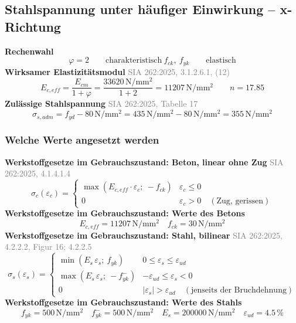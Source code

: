 \documentclass[11pt,a4paper]{article}
\newcommand{\normref}[1]{{\small\textcolor{gray}{#1}}}
\begin{document}
\subsection{Stahlspannung unter häufiger Einwirkung – x-Richtung}
\noindent\textbf{Rechenwahl}
\begin{equation*}
\varphi = 2 \qquad \text{charakteristisch}\ f_{ck},\ f_{yk} \qquad \text{elastisch}
\end{equation*}
\noindent\textbf{Wirksamer Elastizitätsmodul} \hfill \normref{SIA 262:2025, 3.1.2.6.1, (12)}
\begin{equation*}
E_{c,eff} = \frac{E_{cm}}{1 + \varphi} = \frac{33620\,\mathrm{N}/\mathrm{mm}^{2}}{1 + 2} = 11207\,\mathrm{N}/\mathrm{mm}^{2} \qquad n = 17.85
\end{equation*}
\noindent\textbf{Zulässige Stahlspannung} \hfill \normref{SIA 262:2025, Tabelle 17}
\begin{equation*}
\sigma_{s,adm} = f_{yd} - 80\,\mathrm{N}/\mathrm{mm}^{2} = 435\,\mathrm{N}/\mathrm{mm}^{2} - 80\,\mathrm{N}/\mathrm{mm}^{2} = 355\,\mathrm{N}/\mathrm{mm}^{2}
\end{equation*}
\subsubsection{Welche Werte angesetzt werden}
\noindent\textbf{Werkstoffgesetze im Gebrauchszustand: Beton, linear ohne Zug} \hfill \normref{SIA 262:2025, 4.1.4.1.4}
\begin{equation*}
\sigma_c(\varepsilon_c) = \begin{cases} \max\left(E_{c,eff} \cdot \varepsilon_c;\ -f_{ck}\right) & \varepsilon_c \le 0 \\[1ex] 0 & \varepsilon_c > 0 \quad (\text{Zug, gerissen}) \end{cases}
\end{equation*}
\noindent\textbf{Werkstoffgesetze im Gebrauchszustand: Werte des Betons}
\begin{equation*}
E_{c,eff} = 11207\,\mathrm{N}/\mathrm{mm}^{2} \quad f_{ck} = 30\,\mathrm{N}/\mathrm{mm}^{2}
\end{equation*}
\noindent\textbf{Werkstoffgesetze im Gebrauchszustand: Stahl, bilinear} \hfill \normref{SIA 262:2025, 4.2.2.2, Figur 16; 4.2.2.5}
\begin{equation*}
\sigma_s(\varepsilon_s) = \begin{cases} \min(E_s\,\varepsilon_s;\ f_{yk}) & 0 \le \varepsilon_s \le \varepsilon_{ud} \\[1ex] \max(E_s\,\varepsilon_s;\ -f_{yk}^{-}) & -\varepsilon_{ud} \le \varepsilon_s < 0 \\[1ex] 0 & |\varepsilon_s| > \varepsilon_{ud} \quad (\text{jenseits der Bruchdehnung}) \end{cases}
\end{equation*}
\noindent\textbf{Werkstoffgesetze im Gebrauchszustand: Werte des Stahls}
\begin{equation*}
f_{yk} = 500\,\mathrm{N}/\mathrm{mm}^{2} \quad f_{yk}^{-} = 500\,\mathrm{N}/\mathrm{mm}^{2} \quad E_s = 200000\,\mathrm{N}/\mathrm{mm}^{2} \quad \varepsilon_{ud} = 4.5\,\%
\end{equation*}
\end{document}
